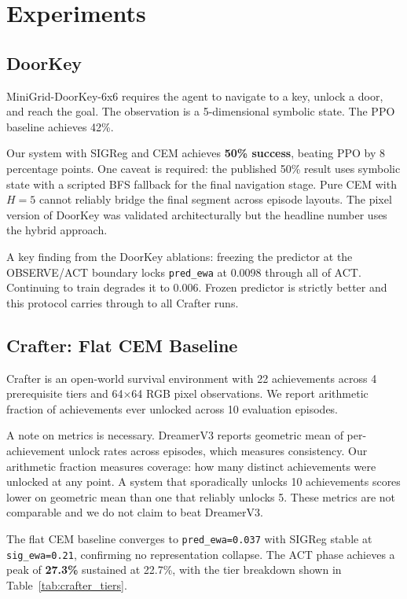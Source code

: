 \documentclass[12pt]{article}
\begin{document}
\section{Experiments}

\subsection{DoorKey}

MiniGrid-DoorKey-6x6 requires the agent to navigate to a key, unlock a door, and reach the goal. The observation is a 5-dimensional symbolic state. The PPO baseline achieves 42\%.

Our system with SIGReg and CEM achieves \textbf{50\% success}, beating PPO by 8 percentage points. One caveat is required: the published 50\% result uses symbolic state with a scripted BFS fallback for the final navigation stage. Pure CEM with $H=5$ cannot reliably bridge the final segment across episode layouts. The pixel version of DoorKey was validated architecturally but the headline number uses the hybrid approach.

A key finding from the DoorKey ablations: freezing the predictor at the OBSERVE/ACT boundary locks \texttt{pred\_ewa} at 0.0098 through all of ACT. Continuing to train degrades it to 0.006. Frozen predictor is strictly better and this protocol carries through to all Crafter runs.

\subsection{Crafter: Flat CEM Baseline}

Crafter is an open-world survival environment with 22 achievements across 4 prerequisite tiers and 64$\times$64 RGB pixel observations. We report arithmetic fraction of achievements ever unlocked across 10 evaluation episodes.

A note on metrics is necessary. DreamerV3 reports geometric mean of per-achievement unlock rates across episodes, which measures consistency. Our arithmetic fraction measures coverage: how many distinct achievements were unlocked at any point. A system that sporadically unlocks 10 achievements scores lower on geometric mean than one that reliably unlocks 5. These metrics are not comparable and we do not claim to beat DreamerV3.

The flat CEM baseline converges to \texttt{pred\_ewa=0.037} with SIGReg stable at \texttt{sig\_ewa=0.21}, confirming no representation collapse. The ACT phase achieves a peak of \textbf{27.3\%} sustained at 22.7\%, with the tier breakdown shown in Table~\ref{tab:crafter_tiers}.
\end{document}
